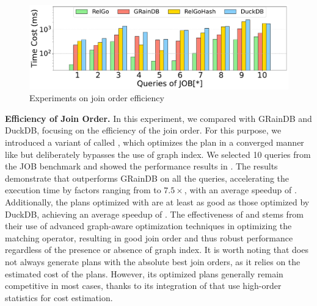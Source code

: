 \begin{figure}[ht]
    \centering
    \includegraphics[width=\linewidth]{./figures/exp/hash_plan_job.pdf}
    \caption{Experiments on join order efficiency}
    \label{fig:exp-hash-plan}
\end{figure}

\noindent\textbf{Efficiency of Join Order.}
In this experiment, we compared \name with GRainDB and DuckDB, focusing on the efficiency of the join order. For this purpose, we introduced a variant of \name called \relgohash, which optimizes the plan in a converged manner like \name but deliberately bypasses the use of graph index. We selected 10 queries from the JOB benchmark and showed the performance results in .
The results demonstrate that \name outperforms GRainDB on all the queries, accelerating the execution time by factors ranging from \revise{$1.4\times$} to $7.5\times$, with an average speedup of \revise{$4.14\times$}. Additionally, the plans optimized with \relgohash are at least as good as those optimized by DuckDB, achieving an average speedup of \revise{$1.6\times$}. The effectiveness of \name and \relgohash stems from their use of advanced graph-aware optimization techniques in optimizing the matching operator, resulting in good join order and thus robust performance regardless of the presence or absence of graph index.
It is worth noting that \name does not always generate plans with the absolute best join orders, as it relies on the estimated cost of the plans. However, its optimized plans generally remain competitive in most cases, thanks to its integration of \glogue that use high-order statistics for cost estimation.



